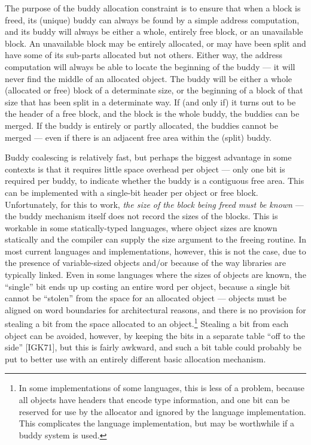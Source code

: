 \documentclass[a4paper,12pt,notitlepage,twoside,openright]{article}
\begin{document}
The purpose of the buddy allocation constraint is to ensure that when a
block is freed, its (unique) buddy can always be found by a simple address
computation, and its buddy will always be either a whole, entirely free block,
or an unavailable block. An unavailable block may be entirely allocated, or may
have been split and have some of its sub-parts allocated but not others. Either
way, the address computation will always be able to locate the beginning of the
buddy --- it will never find the middle of an allocated object. The buddy will be
either a whole (allocated or free) block of a determinate size, or the beginning
of a block of that size that has been split in a determinate way. If (and only
if) it turns out to be the header of a free block, and the block is the whole
buddy, the buddies can be merged. If the buddy is entirely or partly allocated,
the buddies cannot be merged --- even if there is an adjacent free area within the
(split) buddy.

Buddy coalescing is relatively fast, but perhaps the biggest advantage in
some contexts is that it requires little space overhead per object --- only one bit
is required per buddy, to indicate whether the buddy is a contiguous free area.
This can be implemented with a single-bit header per object or free block. Unfortunately,
for this to work, \emph{the size of the block being freed must be known} --- the
buddy mechanism itself does not record the sizes of the blocks. This is workable
in some statically-typed languages, where object sizes are known statically and
the compiler can supply the size argument to the freeing routine. In most current
languages and implementations, however, this is not the case, due to the presence
of variable-sized objects and/or because of the way libraries are typically
linked. Even in some languages where the sizes of objects are known, the ``single''
bit ends up up costing an entire word per object, because a single bit cannot
be ``stolen'' from the space for an allocated object --- objects must be aligned on
word boundaries for architectural reasons, and there is no provision for stealing
a bit from the space allocated to an object.\footnote{In some implementations of some languages, this is less of a problem, because all
objects have headers that encode type information, and one bit can be reserved for
use by the allocator and ignored by the language implementation. This complicates
the language implementation, but may be worthwhile if a buddy system is used.} Stealing a bit from each object
can be avoided, however, by keeping the bits in a separate table ``off to the side''
[IGK71], but this is fairly awkward, and such a bit table could probably be put
to better use with an entirely different basic allocation mechanism.
\end{document}
